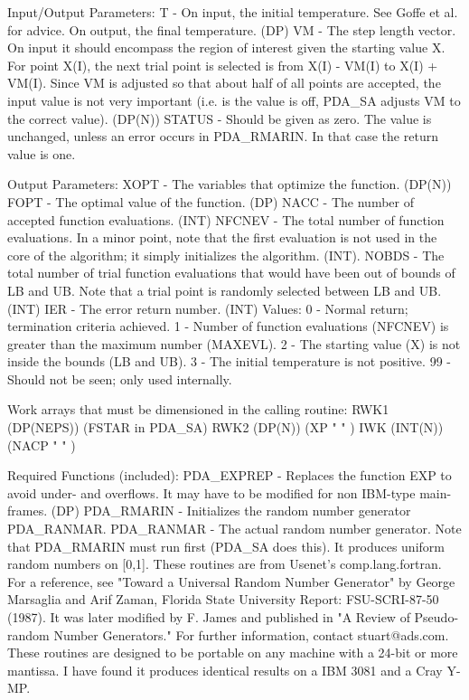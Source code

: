 \documentclass[11pt,twoside,nolof]{starlink}
\begin{document}
\begin{terminalv}
  Input/Output Parameters:
    T - On input, the initial temperature. See Goffe et al. for advice.
        On output, the final temperature. (DP)
    VM - The step length vector. On input it should encompass the
         region of interest given the starting value X. For point
         X(I), the next trial point is selected is from X(I) - VM(I)
         to  X(I) + VM(I). Since VM is adjusted so that about half
         of all points are accepted, the input value is not very
         important (i.e. is the value is off, PDA_SA adjusts VM to the
         correct value). (DP(N))
    STATUS - Should be given as zero. The value is unchanged, unless
             an error occurs in PDA_RMARIN. In that case the return value
             is one.

  Output Parameters:
    XOPT - The variables that optimize the function. (DP(N))
    FOPT - The optimal value of the function. (DP)
    NACC - The number of accepted function evaluations. (INT)
    NFCNEV - The total number of function evaluations. In a minor
             point, note that the first evaluation is not used in the
             core of the algorithm; it simply initializes the
             algorithm. (INT).
    NOBDS - The total number of trial function evaluations that
            would have been out of bounds of LB and UB. Note that
            a trial point is randomly selected between LB and UB.
            (INT)
    IER - The error return number. (INT)
          Values: 0 - Normal return; termination criteria achieved.
                  1 - Number of function evaluations (NFCNEV) is
                      greater than the maximum number (MAXEVL).
                  2 - The starting value (X) is not inside the
                      bounds (LB and UB).
                  3 - The initial temperature is not positive.
                  99 - Should not be seen; only used internally.

  Work arrays that must be dimensioned in the calling routine:
       RWK1 (DP(NEPS))  (FSTAR in PDA_SA)
       RWK2 (DP(N))     (XP    "  " )
       IWK  (INT(N))    (NACP  "  " )

  Required Functions (included):
    PDA_EXPREP - Replaces the function EXP to avoid under- and overflows.
             It may have to be modified for non IBM-type main-
             frames. (DP)
    PDA_RMARIN - Initializes the random number generator PDA_RANMAR.
    PDA_RANMAR - The actual random number generator. Note that
             PDA_RMARIN must run first (PDA_SA does this). It produces uniform
             random numbers on [0,1]. These routines are from
             Usenet's comp.lang.fortran. For a reference, see
             "Toward a Universal Random Number Generator"
             by George Marsaglia and Arif Zaman, Florida State
             University Report: FSU-SCRI-87-50 (1987).
             It was later modified by F. James and published in
             "A Review of Pseudo-random Number Generators." For
             further information, contact stuart@ads.com. These
             routines are designed to be portable on any machine
             with a 24-bit or more mantissa. I have found it produces
             identical results on a IBM 3081 and a Cray Y-MP.


\end{terminalv}
\end{document}

